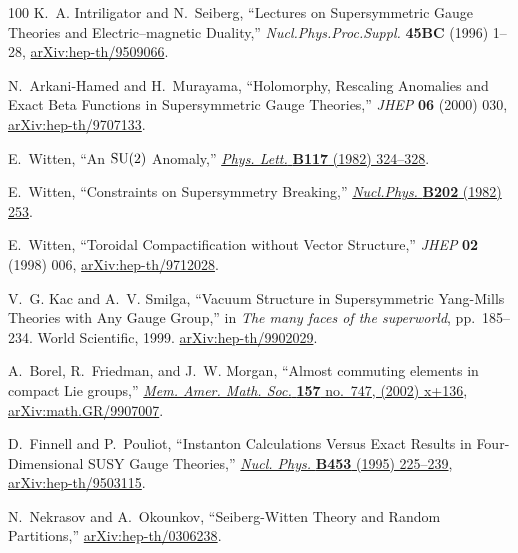 \begin{thebibliography}{100}
K.~A. Intriligator and N.~Seiberg, ``{Lectures on Supersymmetric Gauge Theories and Electric--magnetic Duality},'' {\em Nucl.Phys.Proc.Suppl.} {\bfseries 45BC} (1996) 1--28,
\href{http://arxiv.org/abs/hep-th/9509066}{{\ttfamily arXiv:hep-th/9509066}}.

N.~Arkani-Hamed and H.~Murayama, ``{Holomorphy, Rescaling Anomalies and Exact Beta Functions in Supersymmetric Gauge Theories},'' {\em JHEP} {\bfseries 06} (2000) 030,
\href{http://arxiv.org/abs/hep-th/9707133}{{\ttfamily arXiv:hep-th/9707133}}.

E.~Witten, ``{An $\mathop{\mathrm{SU}}(2)$ Anomaly},''
\href{http://dx.doi.org/10.1016/0370-2693(82)90728-6}{{\em Phys. Lett.} {\bfseries B117} (1982) 324--328}.

E.~Witten, ``{Constraints on Supersymmetry Breaking},''
\href{http://dx.doi.org/10.1016/0550-3213(82)90071-2}{{\em Nucl.Phys.} {\bfseries B202} (1982) 253}.

E.~Witten, ``{Toroidal Compactification without Vector Structure},'' {\em JHEP} {\bfseries 02} (1998) 006,
\href{http://arxiv.org/abs/hep-th/9712028}{{\ttfamily arXiv:hep-th/9712028}}.

V.~G. Kac and A.~V. Smilga, ``{Vacuum Structure in Supersymmetric Yang-Mills Theories with Any Gauge Group},'' in {\em The many faces of the superworld}, pp.~185--234.
\newblock World Scientific, 1999.
\newblock \href{http://arxiv.org/abs/hep-th/9902029}{{\ttfamily arXiv:hep-th/9902029}}.
\newblock

A.~Borel, R.~Friedman, and J.~W. Morgan, ``Almost commuting elements in compact {L}ie groups,''
\href{http://dx.doi.org/10.1090/memo/0747}{{\em Mem. Amer. Math. Soc.} {\bfseries 157} no.~747, (2002) x+136},
\href{http://arxiv.org/abs/math.GR/9907007}{{\ttfamily arXiv:math.GR/9907007}}.

D.~Finnell and P.~Pouliot, ``{Instanton Calculations Versus Exact Results in Four- Dimensional SUSY Gauge Theories},''
\href{http://dx.doi.org/10.1016/0550-3213(95)00318-M}{{\em Nucl. Phys.} {\bfseries B453} (1995) 225--239},
\href{http://arxiv.org/abs/hep-th/9503115}{{\ttfamily arXiv:hep-th/9503115}}.

N.~Nekrasov and A.~Okounkov, ``{Seiberg-Witten Theory and Random Partitions},''
\href{http://arxiv.org/abs/hep-th/0306238}{{\ttfamily arXiv:hep-th/0306238}}.


\end{thebibliography}

